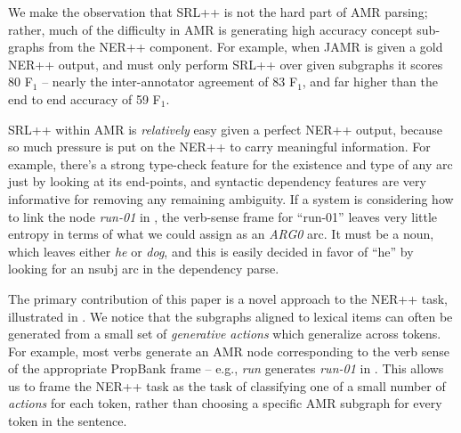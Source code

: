 \documentclass[11pt]{article}
\newcommand\w[1]{\textit{#1}} %
\newcommand\n[1]{\textit{#1}} %
\begin{document}
We make the observation that SRL++ is not the hard part of AMR parsing;
  rather, much of the difficulty in AMR is generating high accuracy concept
  sub-graphs from the NER++ component.
For example, when JAMR \cite{2014flanigan-amr} is given a gold NER++ output, and must only perform SRL++ 
  over given subgraphs it scores 80 F$_1$ -- nearly the inter-annotator agreement of 83 F$_1$, and far higher than the end to end accuracy of 59 F$_1$.

SRL++ within AMR is \textit{relatively} easy given a perfect NER++ output, because so much pressure is put on the NER++ to carry meaningful information.
For example, there's a strong type-check feature for the existence and type of any arc just by looking at its end-points, and syntactic dependency features are very informative for removing any remaining ambiguity.
If a system is considering how to link the node \n{run-01} in , the verb-sense frame for ``run-01'' leaves very little entropy in terms of what we could assign as an \w{ARG0} arc.
It must be a noun, which leaves either \w{he} or \w{dog}, and this is easily decided in favor of ``he'' by looking for an nsubj arc in the dependency parse. 

The primary contribution of this paper is a novel approach to the NER++ task, illustrated in . We notice that the subgraphs aligned to lexical items can often be generated from a small set of \textit{generative actions} which generalize across tokens. For example, most verbs generate an AMR node corresponding to the verb sense of the appropriate PropBank frame -- e.g., \w{run} generates \n{run-01} in . This allows us to frame the NER++ task as the task of classifying one of a small number of \textit{actions} for each token, rather than choosing a specific AMR subgraph for every token in the sentence.
\end{document}
